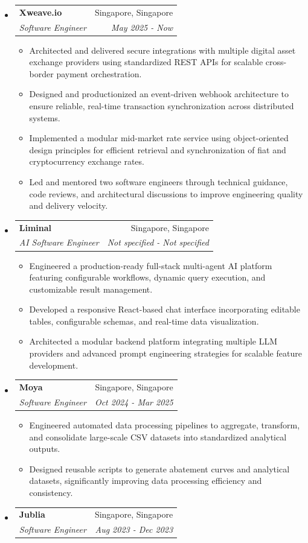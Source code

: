 \documentclass[letterpaper,11pt]{article}
\makeatletter
\newcommand{\resitem}[1]{\item #1 \vspace{-2pt}}
\newcommand{\ressubheading}[4]{
    \begin{tabular*}{6.5in}{p{4.8in}@{\extracolsep{\fill}}r}
            \textbf{#1} & #2 \\
            \textit{#3} & \textit{#4} \\
    \end{tabular*}\vspace{-8pt}}
\makeatother
\begin{document}
      \begin{itemize}
        \item \ressubheading{Xweave.io}{Singapore, Singapore}{Software Engineer}{May 2025 - Now}
        \begin{itemize}
            \resitem{Architected and delivered secure integrations with multiple digital asset exchange providers using standardized REST APIs for scalable cross-border payment orchestration.}
            \resitem{Designed and productionized an event-driven webhook architecture to ensure reliable, real-time transaction synchronization across distributed systems.}
            \resitem{Implemented a modular mid-market rate service using object-oriented design principles for efficient retrieval and synchronization of fiat and cryptocurrency exchange rates.}
            \resitem{Led and mentored two software engineers through technical guidance, code reviews, and architectural discussions to improve engineering quality and delivery velocity.}
        \end{itemize}
        \item \ressubheading{Liminal}{Singapore, Singapore}{AI Software Engineer}{Not specified - Not specified}
        \begin{itemize}
            \resitem{Engineered a production-ready full-stack multi-agent AI platform featuring configurable workflows, dynamic query execution, and customizable result management.}
            \resitem{Developed a responsive React-based chat interface incorporating editable tables, configurable schemas, and real-time data visualization.}
            \resitem{Architected a modular backend platform integrating multiple LLM providers and advanced prompt engineering strategies for scalable feature development.}
        \end{itemize}
        \item \ressubheading{Moya}{Singapore, Singapore}{Software Engineer}{Oct 2024 - Mar 2025}
        \begin{itemize}
            \resitem{Engineered automated data processing pipelines to aggregate, transform, and consolidate large-scale CSV datasets into standardized analytical outputs.}
            \resitem{Designed reusable scripts to generate abatement curves and analytical datasets, significantly improving data processing efficiency and consistency.}
        \end{itemize}
        \item \ressubheading{Jublia}{Singapore, Singapore}{Software Engineer}{Aug 2023 - Dec 2023}

\end{itemize}
\end{document}
